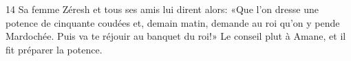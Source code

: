 
14 Sa femme Zéresh et tous ses amis lui dirent alors: «Que l’on dresse une potence de cinquante coudées et, demain matin, demande au roi qu’on y pende Mardochée. Puis va te réjouir au banquet du roi!» Le conseil plut à Amane, et il fit préparer la potence.
